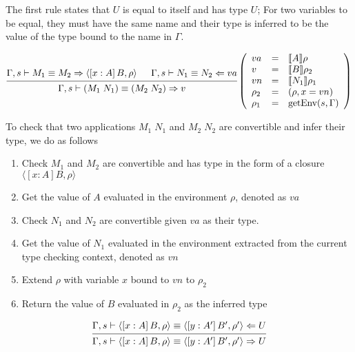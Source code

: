 \documentclass{article}
\theoremstyle{remark}
\begin{document}
The first rule states that $U$ is equal to itself and has type $U$; For two variables to be equal, they must have the same name and their type is inferred to be the value of the type bound to the name in $\Gamma$.

\begin{align}
  \begin{prooftree}
    \hypo{\Gamma,s \vdash M_1 \equiv M_2 \Rightarrow \langle [x : A] \, B, \rho \rangle}
    \hypo{\Gamma,s \vdash N_1 \equiv N_2 \Leftarrow va}
    \infer2{\Gamma,s \vdash (M_1 \; N_1) \equiv (M_2 \; N_2) \Rightarrow v} 
  \end{prooftree}\left(\begin{array}{l l l}
                         va &= &\llbracket A \rrbracket \rho \\
                         v &= &\llbracket B \rrbracket \rho_2 \\
                         vn &= &\llbracket N_1 \rrbracket \rho_1 \\ 
                         \rho_2 &= &(\rho, x = vn) \\
                         \rho_1 &= &\text{getEnv}(s, \Gamma)
                       \end{array}\right)
\end{align}

To check that two applications $M_1 \; N_1$ and $M_2 \; N_2$ are convertible and infer their type, we do as follows
\begin{enumerate}
  \item Check $M_1$ and $M_2$ are convertible and has type in the form of a closure $\langle [x : A] B, \rho \rangle$
  \item Get the value of $A$ evaluated in the environment $\rho$, denoted as $va$
  \item Check $N_1$ and $N_2$ are convertible given $va$ as their type.
  \item Get the value of $N_1$ evaluated in the environment extracted from the current type checking context, denoted as $vn$
  \item Extend $\rho$ with variable $x$ bound to $vn$ to $\rho_2$
  \item Return the value of $B$ evaluated in $\rho_2$ as the inferred type
\end{enumerate}

\begin{align}
  \begin{prooftree}
    \hypo{\Gamma,s \vdash \langle [x : A] \, B, \rho \rangle \equiv \langle [y : A'] \, B', \rho' \rangle \Leftarrow U}
    \infer1{\Gamma,s \vdash \langle [x : A] \, B, \rho \rangle \equiv \langle [y : A'] \, B', \rho' \rangle \Rightarrow U} 
  \end{prooftree}
\end{align}
\end{document}
